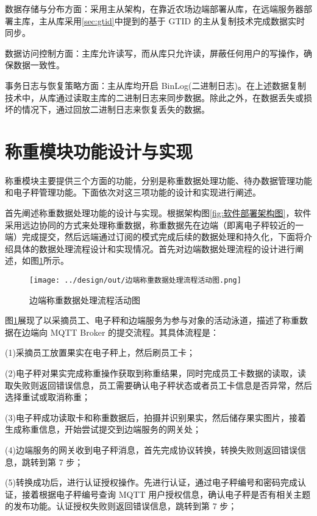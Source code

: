 数据存储与分布方面：采用主从架构，在靠近农场边端部署从库，在远端服务器部署主库，主从库采用\ref{sec:gtid}中提到的基于 GTID 的主从复制技术完成数据实时同步。

数据访问控制方面：主库允许读写，而从库只允许读，屏蔽任何用户的写操作，确保数据一致性。

事务日志与恢复策略方面：主从库均开启 BinLog(二进制日志)。在上述数据复制技术中，从库通过读取主库的二进制日志来同步数据。除此之外，在数据丢失或损坏的情况下，通过回放二进制日志来恢复丢失的数据。

\section{称重模块功能设计与实现}\label{sec:weigh-mod}

称重模块主要提供三个方面的功能，分别是称重数据处理功能、待办数据管理功能和电子秤管理功能。下面依次对这三项功能的设计和实现进行阐述。

首先阐述称重数据处理功能的设计与实现。根据架构图\ref{fig:软件部署架构图}，软件采用远边协同的方式来处理称重数据，称重数据先在边端（即离电子秤较近的一端）完成提交，然后远端通过订阅的模式完成后续的数据处理和持久化，下面将介绍具体的数据处理流程设计和实现情况。首先对边端数据处理流程的设计进行阐述，如图\ref{fig:边端称重数据处理流程活动图}所示。

\begin{figure}
    \centering
    \texttt{[image: ../design/out/边端称重数据处理流程活动图.png]}
    \caption{边端称重数据处理流程活动图}
    \label{fig:边端称重数据处理流程活动图}
\end{figure}

图\ref{fig:边端称重数据处理流程活动图}展现了以采摘员工、电子秤和边端服务为参与对象的活动泳道，描述了称重数据在边端向 MQTT Broker 的提交流程。其具体流程是：

(1)采摘员工放置果实在电子秤上，然后刷员工卡；

(2)电子秤对果实完成称重操作获取到称重结果，同时完成员工卡数据的读取，读取失败则返回错误信息，员工需要确认电子秤状态或者员工卡信息是否异常，然后选择重试或取消称重；

(3)电子秤成功读取卡和称重数据后，拍摄并识别果实，然后储存果实图片，接着生成称重信息，开始尝试提交到边端服务的网关处；

(4)边端服务的网关收到电子秤消息，首先完成协议转换，转换失败则返回错误信息，跳转到第 7 步；

(5)转换成功后，进行认证授权操作。先进行认证，通过电子秤编号和密码完成认证，接着根据电子秤编号查询 MQTT 用户授权信息，确认电子秤是否有相关主题的发布功能。认证授权失败则返回错误信息，跳转到第 7 步；

